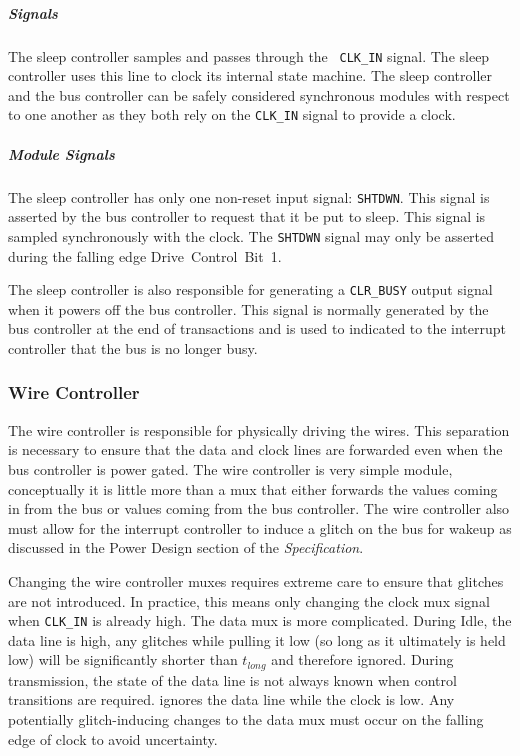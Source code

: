 \subparagraph{\bus Signals}
The sleep controller samples and passes through the \bus~{\tt CLK\_IN} signal.
The sleep controller uses this line to clock its internal state machine.
The sleep controller and the bus controller can be safely considered
synchronous modules with respect to one another as they both rely on the \bus 
{\tt CLK\_IN} signal to provide a clock.

\subparagraph{Module Signals}
The sleep controller has only one non-reset input signal: {\tt SHTDWN}. This
signal is asserted by the bus controller to request that it be put to sleep.
This signal is sampled synchronously with the \bus clock. The {\tt SHTDWN}
signal may only be asserted during the falling edge Drive~Control~Bit~1.

The sleep controller is also responsible for generating a {\tt CLR\_BUSY}
output signal when it powers off the bus controller. This signal is normally
generated by the bus controller at the end of \bus transactions and is used to
indicated to the interrupt controller that the bus is no longer busy.

\subsubsection{Wire Controller}
The wire controller is responsible for physically driving the \bus wires. This
separation is necessary to ensure that the data and clock lines are forwarded
even when the bus controller is power gated.
The wire controller is very simple module, conceptually it is little more than
a mux that either forwards the values coming in from the bus or values coming
from the bus controller. The wire controller also must allow for the interrupt
controller to induce a glitch on the bus for wakeup as discussed in the Power
Design section of the {\em \bus Specification}.

Changing the wire controller muxes requires extreme care to ensure that
glitches are not introduced. In practice, this means only changing the clock
mux signal when {\tt CLK\_IN} is already high. The data mux is more
complicated. During Idle, the data line is high, any glitches while pulling it
low (so long as it ultimately is held low) will be significantly shorter than
$t_{long}$ and therefore ignored. During transmission, the state of the data
line is not always known when control transitions are required. \bus ignores
the data line while the clock is low. Any potentially glitch-inducing changes
to the data mux must occur on the falling edge of clock to avoid uncertainty.

